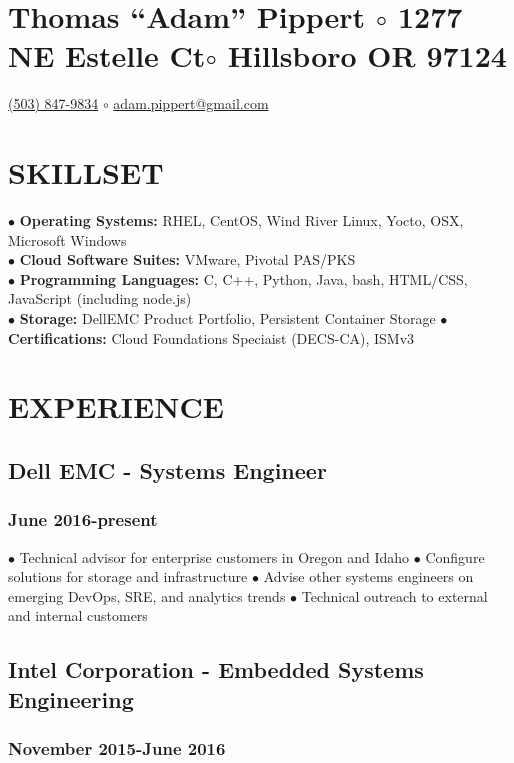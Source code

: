 \documentclass{article}
\begin{document}
\section*{Thomas ``Adam'' Pippert $\circ$
1277 NE Estelle Ct$\circ$
Hillsboro OR 97124}
\href{tel:+15038479834}{(503) 847-9834} $\circ$
\href{mailto:adam.pippert@gmail.com}{adam.pippert@gmail.com}

\section*{SKILLSET}


$\bullet$ \textbf{Operating Systems:} RHEL, CentOS, Wind River Linux, Yocto, OSX, Microsoft Windows\\
$\bullet$ \textbf{Cloud Software Suites:} VMware, Pivotal PAS/PKS\\
$\bullet$ \textbf{Programming Languages:} C, C++, Python, Java, bash, HTML/CSS, JavaScript (including node.js)\\
$\bullet$ \textbf{Storage:} DellEMC Product Portfolio, Persistent Container Storage
$\bullet$ \textbf{Certifications:} Cloud Foundations Speciaist (DECS-CA), ISMv3 


\section*{EXPERIENCE}

\subsection*{Dell EMC - Systems Engineer}
\subsubsection*{June 2016-present}

$\bullet$ Technical advisor for enterprise customers in Oregon and Idaho
$\bullet$ Configure solutions for storage and infrastructure
$\bullet$ Advise other systems engineers on emerging DevOps, SRE, and analytics trends
$\bullet$ Technical outreach to external and internal customers

\subsection*{Intel Corporation - Embedded Systems Engineering}
\subsubsection*{November 2015-June 2016}
\end{document}

